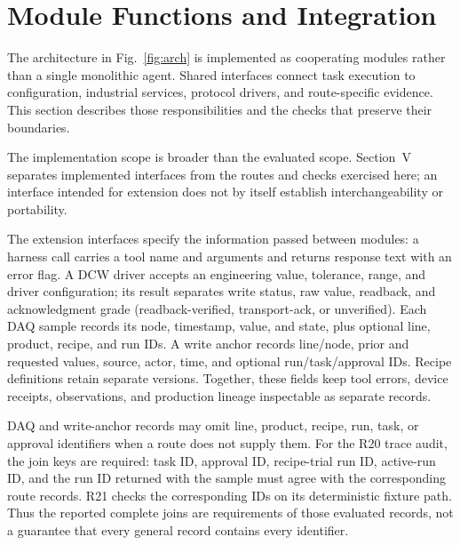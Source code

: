 \section{Module Functions and Integration}
\label{sec:modules}
The architecture in Fig.~\ref{fig:arch} is implemented as cooperating
modules rather than a single monolithic agent. Shared interfaces connect
task execution to configuration, industrial services, protocol drivers, and
route-specific evidence. This section describes those responsibilities and
the checks that preserve their boundaries.

The implementation scope is broader than the evaluated scope. Section~V
separates implemented interfaces from the routes and checks exercised here;
an interface intended for extension does not by itself establish
interchangeability or portability.

The extension interfaces specify the information passed between modules: a
harness call carries a tool name and arguments and returns response text with
an error flag. A DCW driver accepts an engineering value, tolerance, range,
and driver configuration; its result separates write status, raw value,
readback, and acknowledgment grade (readback-verified, transport-ack, or
unverified). Each DAQ sample records its node, timestamp, value, and state,
plus optional line, product, recipe, and run IDs. A write anchor records
line/node, prior and requested values, source, actor, time, and optional
run/task/approval IDs. Recipe definitions retain separate versions. Together,
these fields keep tool errors, device receipts, observations, and production
lineage inspectable as separate records.

DAQ and write-anchor records may omit line, product, recipe, run, task, or
approval identifiers when a route does not supply them. For the R20 trace
audit, the join keys are required: task ID, approval ID, recipe-trial run ID,
active-run ID, and the run ID returned with the sample must agree with the
corresponding route records. R21 checks the corresponding IDs on its
deterministic fixture path. Thus the reported complete joins are requirements
of those evaluated records, not a guarantee that every general record
contains every identifier.

